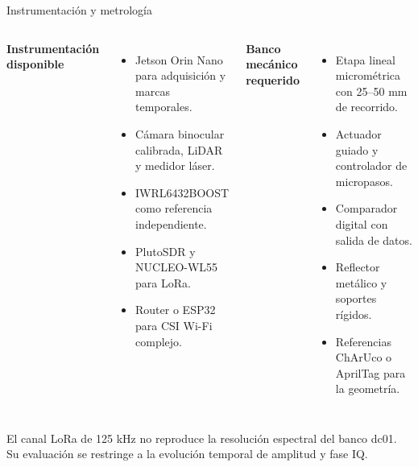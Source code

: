 \documentclass[10pt,aspectratio=169]{beamer}
\begin{document}
\begin{frame}{Instrumentación y metrología}
\small
\begin{columns}[T]
\textbf{Instrumentación disponible}
\begin{itemize}
\item Jetson Orin Nano para adquisición y marcas temporales.
\item Cámara binocular calibrada, LiDAR y medidor láser.
\item IWRL6432BOOST como referencia independiente.
\item PlutoSDR y NUCLEO-WL55 para LoRa.
\item Router o ESP32 para CSI Wi-Fi complejo.
\end{itemize}
\textbf{Banco mecánico requerido}
\begin{itemize}
\item Etapa lineal micrométrica con 25--50 mm de recorrido.
\item Actuador guiado y controlador de micropasos.
\item Comparador digital con salida de datos.
\item Reflector metálico y soportes rígidos.
\item Referencias ChArUco o AprilTag para la geometría.
\end{itemize}
\end{columns}
\vspace{0.2cm}
El canal LoRa de 125 kHz no reproduce la resolución espectral del banco dc01. Su
evaluación se restringe a la evolución temporal de amplitud y fase IQ.
\end{frame}
\end{document}
